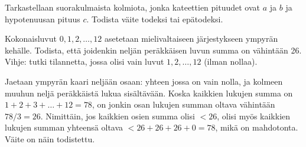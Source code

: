 \begin{tehtavasivu}
	\begin{tehtava}
		Tarkastellaan suorakulmaista kolmiota, jonka kateettien
		pituudet ovat $a$ ja $b$ ja hypotenuusan pituus $c$.
		Todista väite todeksi tai epätodeksi.
		\begin{vastaus}
		\end{vastaus}
	\end{tehtava}

	\begin{tehtava}
		Kokonaisluvut $0, 1, 2, \ldots, 12$ asetetaan
		mielivaltaiseen järjestykseen ympyrän kehälle. Todista,
		että joidenkin neljän peräkkäisen luvun summa on
		vähintään 26. Vihje: tutki tilannetta, jossa olisi vain luvut $1, 2, \ldots, 12$ (ilman nollaa).
		\begin{vastaus}
			Jaetaan ympyrän kaari neljään osaan: yhteen jossa on vain nolla, ja kolmeen muuhun neljä peräkkäistä lukua sisältävään. Koska kaikkien lukujen summa on $1 + 2 + 3 + \ldots + 12 = 78$, on jonkin osan lukujen summan oltava vähintään $78/3 = 26$. Nimittäin, jos kaikkien osien summa olisi $< 26$, olisi myös kaikkien lukujen summan yhteensä oltava $< 26 + 26 + 26 + 0 = 78$, mikä on mahdotonta. Väite on näin todistettu.
		\end{vastaus}
	\end{tehtava}

\end{tehtavasivu}

